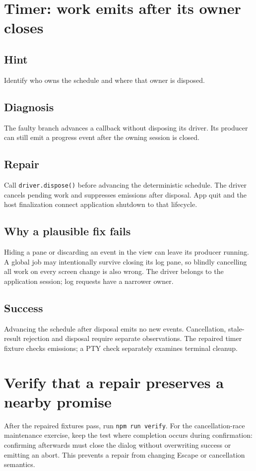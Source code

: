\section{Timer: work emits after its owner closes}

\subsection{Hint}

Identify who owns the schedule and where that owner is disposed.

\subsection{Diagnosis}

The faulty branch advances a callback without disposing its driver. Its producer can still emit a progress event after the owning session is closed.

\subsection{Repair}

Call \texttt{driver.dispose()} before advancing the deterministic schedule. The driver cancels pending work and suppresses emissions after disposal. App quit and the host finalization connect application shutdown to that lifecycle.

\subsection{Why a plausible fix fails}

Hiding a pane or discarding an event in the view can leave its producer running. A global job may intentionally survive closing its log pane, so blindly cancelling all work on every screen change is also wrong. The driver belongs to the application session; log requests have a narrower owner.

\subsection{Success}

Advancing the schedule after disposal emits no new events. Cancellation, stale-result rejection and disposal require separate observations. The repaired timer fixture checks emissions; a PTY check separately examines terminal cleanup.

\section{Verify that a repair preserves a nearby promise}

After the repaired fixtures pass, run \texttt{npm run verify}. For the cancellation-race maintenance exercise, keep the test where completion occurs during confirmation: confirming afterwards must close the dialog without overwriting success or emitting an abort. This prevents a repair from changing Escape or cancellation semantics.
